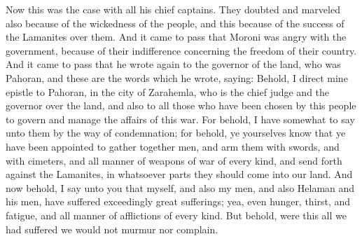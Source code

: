Now this was the case with all his chief captains. They doubted and marveled also because of the wickedness of the people, and this because of the success of the Lamanites over them.
\bverse \iffalse And it came to pass that Moroni was angry with the government, because of their indifference concerning the freedom of their country. \fi
And it came to pass that Moroni was angry with the government, because of their indifference concerning the freedom of their country.
\bchapter
\bverse \iffalse And it came to pass that he wrote again to the governor of the land, who was Pahoran, and these are the words which he wrote, saying: Behold, I direct mine epistle to Pahoran, in the city of Zarahemla, who is the chief judge and the governor over the land, and also to all those who have been chosen by this people to govern and manage the affairs of this war. \fi
And it came to pass that he wrote again to the governor of the land, who was Pahoran, and these are the words which he wrote, saying: Behold, I direct mine epistle to Pahoran, in the city of Zarahemla, who is the chief judge and the governor over the land, and also to all those who have been chosen by this people to govern and manage the affairs of this war.
\bverse \iffalse For behold, I have somewhat to say unto them by the way of condemnation; for behold, ye yourselves know that ye have been appointed to gather together men, and arm them with swords, and with cimeters, and all manner of weapons of war of every kind, and send forth against the Lamanites, in whatsoever parts they should come into our land. \fi
For behold, I have somewhat to say unto them by the way of condemnation; for behold, ye yourselves know that ye have been appointed to gather together men, and arm them with swords, and with cimeters, and all manner of weapons of war of every kind, and send forth against the Lamanites, in whatsoever parts they should come into our land.
\bverse \iffalse And now behold, I say unto you that myself, and also my men, and also Helaman and his men, have suffered exceedingly great sufferings; yea, even hunger, thirst, and fatigue, and all manner of afflictions of every kind. \fi
And now behold, I say unto you that myself, and also my men, and also Helaman and his men, have suffered exceedingly great sufferings; yea, even hunger, thirst, and fatigue, and all manner of afflictions of every kind.
\bverse \iffalse But behold, were this all we had suffered we would not murmur nor complain. \fi
But behold, were this all we had suffered we would not murmur nor complain.
